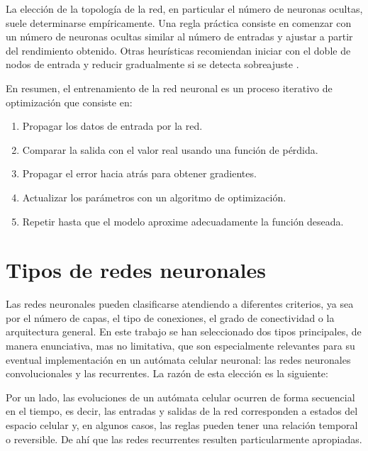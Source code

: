La elección de la topología de la red, en particular el número de neuronas ocultas, suele determinarse empíricamente. Una regla práctica consiste en comenzar con un número de neuronas ocultas similar al número de entradas y ajustar a partir del rendimiento obtenido. Otras heurísticas recomiendan iniciar con el doble de nodos de entrada y reducir gradualmente si se detecta sobreajuste \cite{ann_extra}.

En resumen, el entrenamiento de la red neuronal es un proceso iterativo de optimización que consiste en:

\begin{enumerate}
	
	\item Propagar los datos de entrada por la red.
	
	\item Comparar la salida con el valor real usando una función de pérdida.
	
	\item Propagar el error hacia atrás para obtener gradientes.
	
	\item Actualizar los parámetros con un algoritmo de optimización.
	
	\item Repetir hasta que el modelo aproxime adecuadamente la función deseada.
	
\end{enumerate}

\section{Tipos de redes neuronales}

Las redes neuronales pueden clasificarse atendiendo a diferentes criterios, ya sea por el número de capas, el tipo de conexiones, el grado de conectividad o la arquitectura general. En este trabajo se han seleccionado dos tipos principales, de manera enunciativa, mas no limitativa, que son especialmente relevantes para su eventual implementación en un autómata celular neuronal: las redes neuronales convolucionales y las recurrentes. La razón de esta elección es la siguiente:

Por un lado, las evoluciones de un autómata celular ocurren de forma secuencial en el tiempo, es decir, las entradas y salidas de la red corresponden a estados del espacio celular y, en algunos casos, las reglas pueden tener una relación temporal o reversible. De ahí que las redes recurrentes resulten particularmente apropiadas.

